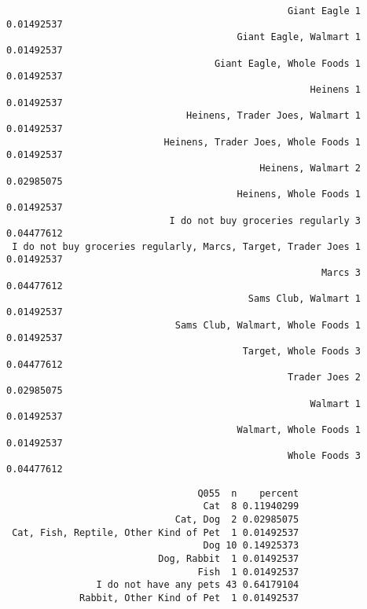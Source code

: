 \documentclass[]{article}
\newenvironment{Shaded}{\begin{snugshade}}{\end{snugshade}}
\newcommand{\KeywordTok}[1]{\textcolor[rgb]{0.13,0.29,0.53}{\textbf{#1}}}
\newcommand{\NormalTok}[1]{#1}
\newcommand{\OperatorTok}[1]{\textcolor[rgb]{0.81,0.36,0.00}{\textbf{#1}}}
\newcommand{\StringTok}[1]{\textcolor[rgb]{0.31,0.60,0.02}{#1}}
\begin{document}
\begin{verbatim}
                                                  Giant Eagle 1 0.01492537
                                         Giant Eagle, Walmart 1 0.01492537
                                     Giant Eagle, Whole Foods 1 0.01492537
                                                      Heinens 1 0.01492537
                                Heinens, Trader Joes, Walmart 1 0.01492537
                            Heinens, Trader Joes, Whole Foods 1 0.01492537
                                             Heinens, Walmart 2 0.02985075
                                         Heinens, Whole Foods 1 0.01492537
                             I do not buy groceries regularly 3 0.04477612
 I do not buy groceries regularly, Marcs, Target, Trader Joes 1 0.01492537
                                                        Marcs 3 0.04477612
                                           Sams Club, Walmart 1 0.01492537
                              Sams Club, Walmart, Whole Foods 1 0.01492537
                                          Target, Whole Foods 3 0.04477612
                                                  Trader Joes 2 0.02985075
                                                      Walmart 1 0.01492537
                                         Walmart, Whole Foods 1 0.01492537
                                                  Whole Foods 3 0.04477612
\end{verbatim}

\begin{Shaded}
\end{Shaded}

\begin{verbatim}
                                  Q055  n    percent
                                   Cat  8 0.11940299
                              Cat, Dog  2 0.02985075
 Cat, Fish, Reptile, Other Kind of Pet  1 0.01492537
                                   Dog 10 0.14925373
                           Dog, Rabbit  1 0.01492537
                                  Fish  1 0.01492537
                I do not have any pets 43 0.64179104
             Rabbit, Other Kind of Pet  1 0.01492537
\end{verbatim}
\end{document}
